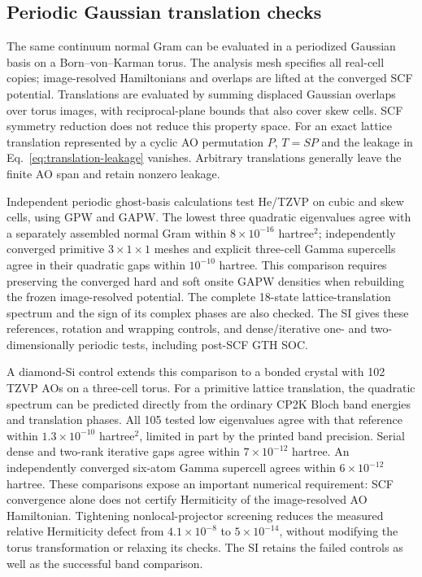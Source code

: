 \subsection{Periodic Gaussian translation checks}
The same continuum normal Gram can be evaluated in a periodized
Gaussian basis on a Born--von--Karman torus. The analysis mesh
specifies all real-cell copies; image-resolved Hamiltonians and
overlaps are lifted at the converged SCF potential. Translations
are evaluated by summing displaced Gaussian overlaps over torus
images, with reciprocal-plane bounds that also cover skew cells.
SCF symmetry reduction does not reduce this property space.
For an exact lattice translation represented by a cyclic AO
permutation $P$, $T=SP$ and the leakage in
Eq.~\eqref{eq:translation-leakage} vanishes. Arbitrary translations
generally leave the finite AO span and retain nonzero leakage.

Independent periodic ghost-basis calculations test He/TZVP on
cubic and skew cells, using GPW and GAPW. The lowest three
quadratic eigenvalues agree with a separately assembled normal
Gram within $8\times10^{-16}$ hartree$^2$; independently converged
primitive $3\times1\times1$ meshes and explicit three-cell Gamma
supercells agree in their quadratic gaps within
$10^{-10}$ hartree. This comparison requires preserving the
converged hard and soft onsite GAPW densities when rebuilding
the frozen image-resolved potential. The complete 18-state
lattice-translation spectrum and the sign of its complex phases
are also checked. The SI gives these references, rotation and
wrapping controls, and dense/iterative one- and two-dimensionally
periodic tests, including post-SCF GTH SOC.

A diamond-Si control extends this comparison to a bonded crystal
with 102 TZVP AOs on a three-cell torus. For a primitive lattice
translation, the quadratic spectrum can be predicted directly
from the ordinary CP2K Bloch band energies and translation
phases. All 105 tested low eigenvalues agree with that reference
within $1.3\times10^{-10}$ hartree$^2$, limited in part by the
printed band precision. Serial dense and two-rank iterative gaps
agree within $7\times10^{-12}$ hartree. An independently
converged six-atom Gamma supercell agrees within
$6\times10^{-12}$ hartree. These comparisons expose an
important numerical requirement: SCF convergence alone does not
certify Hermiticity of the image-resolved AO Hamiltonian.
Tightening nonlocal-projector screening reduces the measured
relative Hermiticity defect from $4.1\times10^{-8}$ to
$5\times10^{-14}$, without modifying the torus transformation or
relaxing its checks. The SI retains the failed controls as well
as the successful band comparison.

